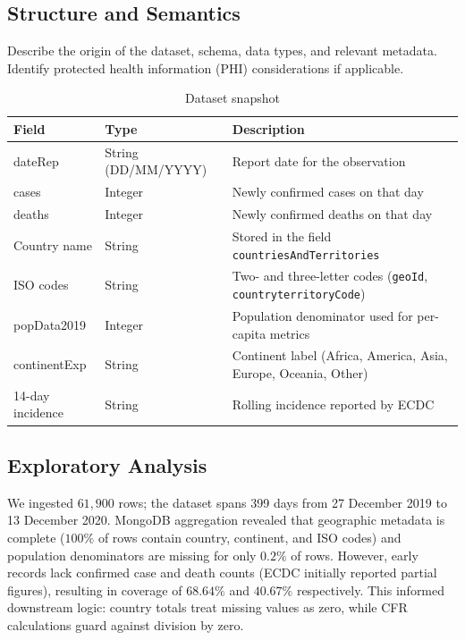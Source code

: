 \documentclass[12pt, a4paper]{article}
\begin{document}
\subsection{Structure and Semantics}
Describe the origin of the dataset, schema, data types, and relevant metadata. Identify protected health information (PHI) considerations if applicable.
\begin{table}[H]
    \centering
    \caption{Dataset snapshot}
    \label{tab:datasets}
    \begin{tabular}{@{}p{3.5cm}p{2.5cm}p{6cm}@{}}
        \toprule
        Field & Type & Description \\
        \midrule
        dateRep & String (DD/MM/YYYY) & Report date for the observation \\
        cases & Integer & Newly confirmed cases on that day \\
        deaths & Integer & Newly confirmed deaths on that day \\
        Country name & String & Stored in the field \texttt{countriesAndTerritories} \\
        ISO codes & String & Two- and three-letter codes (\texttt{geoId}, \texttt{countryterritoryCode}) \\
        popData2019 & Integer & Population denominator used for per-capita metrics \\
        continentExp & String & Continent label (Africa, America, Asia, Europe, Oceania, Other) \\
        14-day incidence & String & Rolling incidence reported by ECDC \\
        \bottomrule
    \end{tabular}
\end{table}

\subsection{Exploratory Analysis}
We ingested $61{,}900$ rows; the dataset spans 399 days from 27 December 2019 to 13 December 2020. MongoDB aggregation revealed that geographic metadata is complete ($100\%$ of rows contain country, continent, and ISO codes) and population denominators are missing for only $0.2\%$ of rows. However, early records lack confirmed case and death counts (ECDC initially reported partial figures), resulting in coverage of $68.64\%$ and $40.67\%$ respectively. This informed downstream logic: country totals treat missing values as zero, while CFR calculations guard against division by zero.
\end{document}
